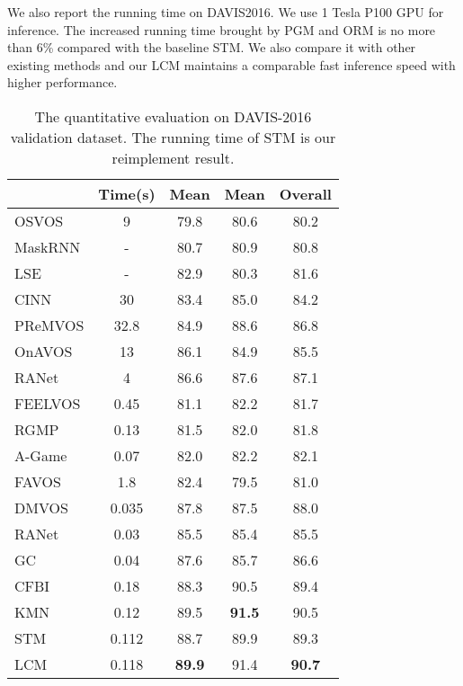 \documentclass[final]{cvpr}
\begin{document}
We also report the running time on DAVIS2016. We use 1 Tesla P100 GPU for inference. The increased running time brought by PGM and ORM is no more than 6\% compared with the baseline STM. We also compare it with other existing methods and our LCM maintains a comparable fast inference speed with higher performance.


\begin{table}
	\centering
	
\begin{center}
\begin{tabular}{lcccc} 
\hline
 & Time(s) &  Mean &  Mean & Overall \\
\hline
OSVOS\cite{osvos} & 9 & 79.8 & 80.6 & 80.2 \\
MaskRNN\cite{maskrnn} & - & 80.7 & 80.9 & 80.8 \\  
LSE\cite{LSE} & - & 82.9 & 80.3 &  81.6 \\
CINN\cite{cinn} & 30 & 83.4 & 85.0 & 84.2 \\
PReMVOS\cite{premvos} & 32.8 & 84.9 & 88.6 & 86.8 \\
OnAVOS\cite{OnAVOS} & 13 & 86.1 & 84.9 &  85.5 \\
RANet\cite{ranet}   & 4 &  86.6 &  87.6 & 87.1 \\
FEELVOS\cite{feelvos} & 0.45   & 81.1 &  82.2 &  81.7 \\
RGMP\cite{rgmp} & 0.13 & 81.5 & 82.0 &  81.8 \\
A-Game\cite{agame} & 0.07 &  82.0 & 82.2 & 82.1 \\
FAVOS\cite{favos} & 1.8 &  82.4 &  79.5 &  81.0 \\
DMVOS\cite{dmvos} & 0.035 & 87.8 & 87.5 & 88.0\\
RANet\cite{ranet}   & 0.03 &  85.5 & 85.4 & 85.5 \\ 
GC\cite{GC}   & 0.04 &  87.6 & 85.7 &  86.6 \\
CFBI\cite{cfbi} & 0.18 &  88.3 & 90.5 &  89.4 \\

KMN\cite{KMN}  & 0.12 &  89.5 & \textbf{91.5} & 90.5 \\

\hline
STM\cite{STM} & 0.112 & 88.7 & 89.9 &  89.3 \\ 
LCM   & 0.118 & \textbf{89.9} & 91.4 & \textbf{90.7}  \\
\hline
\end{tabular}
\end{center} 	\caption{The quantitative evaluation on DAVIS-2016 validation dataset. The running time of STM is our reimplement result.}
	\label{table:davis2016}
\end{table}
\end{document}
